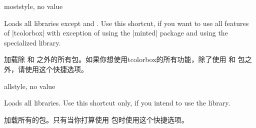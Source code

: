 












\begin{docTcbKey}[library]{most}{}{style, no value}

Loads all libraries except  and .
Use this shortcut, if you want to use all features of |tcolorbox|
with exception of using the |minted| package and using
the specialized  library.

加载除  和  之外的所有包。如果你想使用tcolorbox的所有功能，除了使用  和  包之外，请使用这个快捷选项。
\end{docTcbKey}

\begin{docTcbKey}[library]{all}{}{style, no value}

Loads all libraries. Use this shortcut only, if you intend to use the
 library.

加载所有的包。只有当你打算使用  包时使用这个快捷选项。

\end{docTcbKey}


